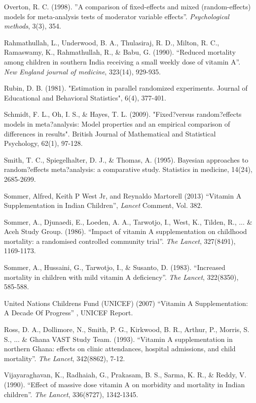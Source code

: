 \documentclass[12pt]{article}
\begin{document}
\begin{thebibliography}{99}
\bibitem Overton, R. C. (1998). ''A comparison of fixed-effects and mixed (random-effects) models for meta-analysis tests of moderator variable effects''. \emph{Psychological methods}, 3(3), 354.

\bibitem Rahmathullah, L., Underwood, B. A., Thulasiraj, R. D., Milton, R. C., Ramaswamy, K., Rahmathullah, R., \& Babu, G. (1990). ``Reduced mortality among children in southern India receiving a small weekly dose of vitamin A''. \emph{New England journal of medicine}, 323(14), 929-935.

 Rubin, D. B. (1981). "Estimation in parallel randomized experiments. Journal of Educational and Behavioral Statistics", 6(4), 377-401.

 Schmidt, F. L., Oh, I. S., \& Hayes, T. L. (2009). "Fixed?versus random?effects models in meta?analysis: Model properties and an empirical comparison of differences in results". British Journal of Mathematical and Statistical Psychology, 62(1), 97-128.

 Smith, T. C., Spiegelhalter, D. J., \& Thomas, A. (1995). Bayesian approaches to random?effects meta?analysis: a comparative study. Statistics in medicine, 14(24), 2685-2699.

\bibitem  Sommer, Alfred, Keith P West Jr, and Reynaldo Martorell (2013) ``Vitamin A Supplementation in Indian Children'', \emph{Lancet} Comment, Vol. 382.

 Sommer, A., Djunaedi, E., Loeden, A. A., Tarwotjo, I., West, K., Tilden, R., ... \& Aceh Study Group. (1986). ``Impact of vitamin A supplementation on childhood mortality: a randomised controlled community trial''. \emph{The Lancet}, 327(8491), 1169-1173.

 Sommer, A., Hussaini, G., Tarwotjo, I., \& Susanto, D. (1983). ``Increased mortality in children with mild vitamin A deficiency''. \emph{The Lancet}, 322(8350), 585-588.

 United Nations Childrens Fund (UNICEF) (2007) ``Vitamin A Supplementation: A Decade Of Progress'' , UNICEF Report. 

 Ross, D. A., Dollimore, N., Smith, P. G., Kirkwood, B. R., Arthur, P., Morris, S. S., ... \& Ghana VAST Study Team. (1993). ``Vitamin A supplementation in northern Ghana: effects on clinic attendances, hospital admissions, and child mortality''. \emph{The Lancet}, 342(8862), 7-12.

 Vijayaraghavan, K., Radhaiah, G., Prakasam, B. S., Sarma, K. R., \& Reddy, V. (1990). ``Effect of massive dose vitamin A on morbidity and mortality in Indian children''. \emph{The Lancet}, 336(8727), 1342-1345.


\end{thebibliography}
\end{document}
